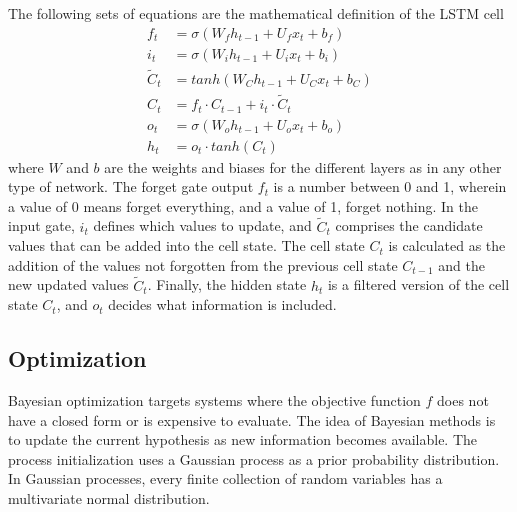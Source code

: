 The following sets of equations are the mathematical definition of the LSTM cell
\begin{align}
f_t &= \sigma \left( W_f h_{t-1} + U_f x_t + b_f \right)  \label{eq:lstm1} \\
i_t &= \sigma \left( W_i h_{t-1} + U_i x_t + b_i \right)  \label{eq:lstm2} \\
\tilde{C}_t &= tanh \left( W_C h_{t-1} + U_C x_t + b_C \right)  \label{eq:lstm3} \\
C_t &= f_t \cdot C_{t-1} + i_t \cdot \tilde{C}_t          \label{eq:lstm3} \\
o_t &= \sigma \left( W_o h_{t-1} + U_o x_t + b_o \right)  \label{eq:lstm4} \\
h_t &= o_t \cdot tanh \left( C_t \right)                  \label{eq:lstm5}
\end{align}
where $W$ and $b$ are the weights and biases for the different layers as in any other type of network.
The forget gate output $f_t$ is a number between 0 and 1, wherein a value of 0 means forget everything, and a value of 1, forget nothing.
In the input gate, $i_t$ defines which values to update, and $\tilde{C}_t$ comprises the candidate values that can be added into the cell state.
The cell state $C_t$ is calculated as the addition of the values not forgotten from the previous cell state $C_{t-1}$ and the new updated values $\tilde{C}_t$.
Finally, the hidden state $h_t$ is a filtered version of the cell state $C_t$, and $o_t$ decides what information is included.


\subsection{Optimization}
\label{sec:opt}


Bayesian optimization targets systems where the objective function $f$ does not have a closed form or is expensive to evaluate.
The idea of Bayesian methods is to update the current hypothesis as new information becomes available.
The process initialization uses a Gaussian process as a prior probability distribution.
In Gaussian processes, every finite collection of random variables has a multivariate normal distribution.

